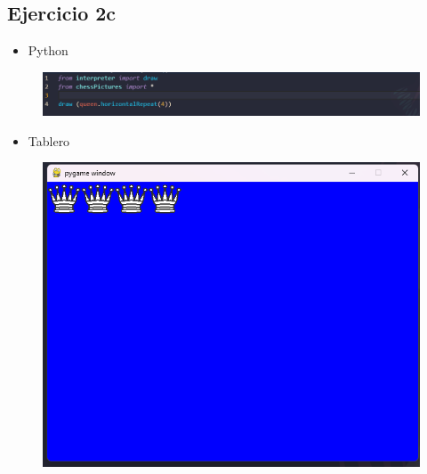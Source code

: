 \documentclass{article}
\begin{document}
	\subsection{Ejercicio 2c}
	\begin{itemize}
		\item Python
	\end{itemize}
	\begin{figure}[H]
		\centering
		\includegraphics[width=1.0\textwidth, keepaspectratio]{img/ejercicio2c}
	\end{figure}
	\begin{itemize}
		\item Tablero
	\end{itemize}
	\begin{figure}[H]
		\centering
		\includegraphics[width=1.0\textwidth, keepaspectratio]{img/ejercicio2cc}
	\end{figure}
	
\end{document}

